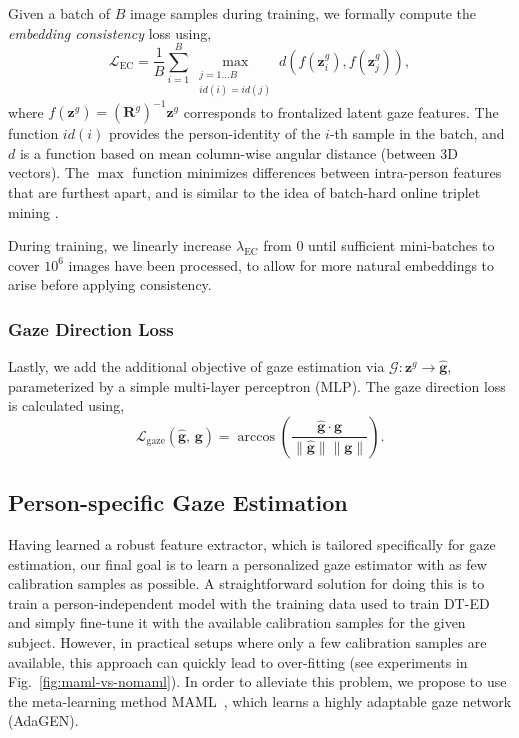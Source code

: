 \documentclass[10pt,twocolumn,letterpaper]{article}
\begin{document}
Given a batch of $B$ image samples during training, we formally compute the \emph{embedding consistency} loss using,
\begin{equation}
    \mathcal{L}_\mathrm{EC} = 
    \frac{1}{B}
    \sum_{i=1}^{B}
    \max_{\substack{j=1\ldots B\\id(i) = id(j)}}
        d\left( f(\mathbf{z}^g_i),f(\mathbf{z}^g_j) \right),
    \label{eq:embedding consistency_loss}
\end{equation}
where $f(\mathbf{z}^g) = \left(\mathbf{R}^g\right)^{-1}\mathbf{z}^g$ corresponds to frontalized latent gaze features. The function $id(i)$ provides the person-identity of the $i$-th sample in the batch, and $d$ is a function based on mean column-wise angular distance (between 3D vectors).
The $\max$ function minimizes differences between intra-person features that are furthest apart, and is similar to the idea of batch-hard online triplet mining \cite{Schroff2015CVPR}.








During training, we linearly increase $\lambda_\mathrm{EC}$ from $0$ until sufficient mini-batches to cover $10^6$ images have been processed, to allow for more natural embeddings to arise before applying consistency.



\subsubsection{Gaze Direction Loss}
Lastly, we add the additional objective of gaze estimation via $\mathcal{G}: \mathbf{z}^g \rightarrow \hat{\mathbf{g}}$, parameterized by a simple multi-layer perceptron (MLP).
The gaze direction loss is calculated using,
\begin{equation}
    \mathcal{L}_\mathrm{gaze}\left(\hat{\mathbf{g}},\,\mathbf{g}\right)
    =\arccos{\left(\frac{\hat{\mathbf{g}}\cdot\mathbf{g}}{\|\hat{\mathbf{g}}\|\|\mathbf{g}\|}\right)}.
    \label{eq:gaze_loss}
\end{equation}

\subsection{Person-specific Gaze Estimation \label{sec:PS-GEN}}
Having learned a robust feature extractor, which is tailored specifically for gaze estimation, our final goal is to learn a personalized gaze estimator 
with as few calibration samples as possible. A straightforward solution for doing this is to train a person-independent model with the training data used to train DT-ED and simply fine-tune it with the available calibration samples for the given subject. However, in practical setups where only a few calibration samples are available, this approach can quickly lead to over-fitting 
(see experiments in Fig.~\ref{fig:maml-vs-nomaml}). In order to alleviate this problem, we propose to use the meta-learning method MAML~\cite{Finn2017ICML}, which learns a highly adaptable gaze network (AdaGEN).
\end{document}
